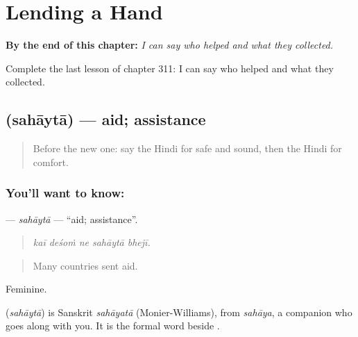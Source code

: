 
\chapter{Lending a Hand}
\label{ch:hi-lending-a-hand}

\begin{chapteropening}
\textbf{By the end of this chapter:} \emph{I can say who helped and what they collected.}

Complete the last lesson of chapter 311: I can say who helped and what they collected.
\end{chapteropening}

\section[\texorpdfstring{\hi{सहायता} (sahāytā)}{सहायता (sahāytā)}]{ (sahāytā) — aid; assistance}

\label{lesson:HI-C311-sahayta}



\begin{quote}
Before the new one: say the Hindi for safe and sound, then the Hindi for comfort.
\end{quote}

\subsection*{You'll want to know: }
\textbf{} — \emph{sahāytā} — \textquotedblleft{}aid; assistance\textquotedblright{}.

\begin{quote}
    
\end{quote}

\begin{quote}
\emph{kaī deśoṁ ne sahāytā bhejī.}
\end{quote}

\begin{quote}
Many countries sent aid.
\end{quote}

Feminine.

\begin{cousinweb}
\textbf{} (\emph{sahāytā}) is Sanskrit \emph{sahāyatā} (Monier-Williams), from \emph{sahāya}, a companion who goes along with you. It is the formal word beside \textbf{}.
\end{cousinweb}

